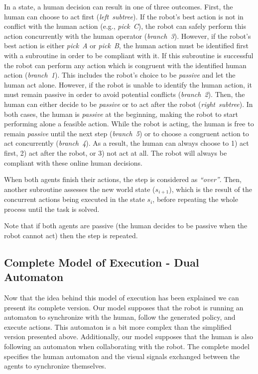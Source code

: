 In a state, a human decision can result in one of three outcomes.
First, the human can choose to act first (\textit{left~subtree}).
If the robot's best action is not in conflict with the human action (e.g., \textit{pick~C}), the robot can safely perform this action concurrently with the human operator (\textit{branch~3}).
However, if the robot's best action is either \textit{pick~A} or \textit{pick~B}, the human action must be identified first with a subroutine in order to be compliant with it.
If this subroutine is successful the robot can perform any action which is congruent with the identified human action (\textit{branch~1}). 
This includes the robot's choice to be \textit{passive} and let the human act alone. 
However, if the robot is unable to identify the human action, it must remain passive in order to avoid potential conflicts (\textit{branch~2}). 
Then, the human can either decide to be \textit{passive} or to act after the robot (\textit{right~subtree}). 
In both cases, the human is \textit{passive} at the beginning, making the robot to start performing alone a feasible action. 
While the robot is acting, the human is free to remain \textit{passive} until the next step (\textit{branch~5}) or to choose a congruent action to act concurrently (\textit{branch~4}). 
As a result, the human can always choose to 1) act first, 2) act after the robot, or 3) not act at all. 
The robot will always be compliant with these online human decisions.

When both agents finish their actions, the step is considered as \textit{``over''}. 
Then, another subroutine assesses the new world state ($s_{i+1}$), which is the result of the concurrent actions being executed in the state $s_i$, before repeating the whole process until the task is solved.

Note that if both agents are passive (the human decides to be passive when the robot cannot act) then the step is repeated. 

\subsection{Complete Model of Execution - Dual Automaton}

Now that the idea behind this model of execution has been explained we can present its complete version. Our model supposes that the robot is running an automaton to synchronize with the human, follow the generated policy, and execute actions. This automaton is a bit more complex than the simplified version presented above. Additionally, our model supposes that the human is also following an automaton when collaborating with the robot. The complete model specifies the human automaton and the visual signals exchanged between the agents to synchronize themselves.


